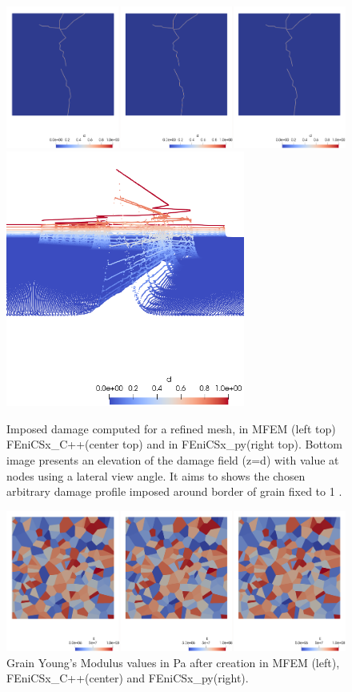 \documentclass[12pt]{article}
\newcommand{\f}[1]{FEniCSx#1}
\begin{document}
\begin{figure}
	\centering
	\includegraphics[width=1.\textwidth]{dam.png}
	\includegraphics[width=0.7\textwidth]{dam_extrude.png}
	\caption{Imposed damage computed for a refined mesh, in MFEM (left top) \f{\_C++}(center top) and in \f{\_py}(right top). Bottom image presents  an elevation of the damage field (z=d) with value at nodes using a lateral view angle. It aims to shows the chosen arbitrary damage profile imposed around border of grain fixed to 1 . \label{damage}}
\end{figure}
\begin{figure}
	\includegraphics[width=1.\textwidth]{E.png}
	\caption{Grain Young's Modulus values in Pa after creation in MFEM (left), \f{\_C++}(center) and  \f{\_py}(right).\label{E_young}}
\end{figure}
\end{document}
